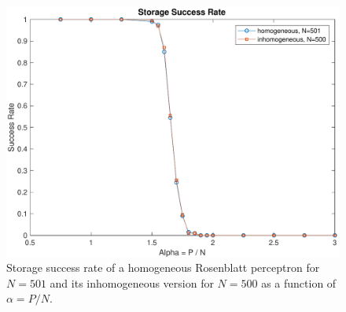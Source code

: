 \begin{figure}[t]
	\centering
	\includegraphics[width=\columnwidth]{figures/homogeneous_n_n1}
    \caption{Storage success rate of a homogeneous Rosenblatt perceptron for $N = 501$ and its inhomogeneous version for $N = 500$ as a function of $\alpha = P / N$.}
	\label{fig:homogeneous_n_n1}
\end{figure}
